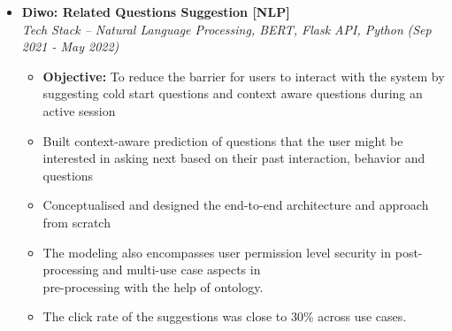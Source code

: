 \documentclass[a4paper,10pt]{article}
\newcommand{\isep}{-2 pt}
\begin{document}
\begin{itemize}
\item \textbf{Diwo: Related Questions Suggestion [NLP]}  \\
    \emph{Tech Stack -- Natural Language Processing, BERT, Flask API, Python } \hfill {\emph{(Sep 2021 - May 2022)}}
    \\[-0.6cm]
    \begin{itemize}\itemsep \isep
    	\item \textbf{Objective:} To reduce the barrier for users to interact with the system by suggesting cold start questions and context aware questions during an active session 
        \item Built context-aware prediction of questions that the user might be interested in asking next based on their past interaction, behavior and questions
        \item Conceptualised and designed the end-to-end architecture and approach from scratch 
        \item The modeling also encompasses user permission level security in post-processing and multi-use case aspects in \\ pre-processing with the help of ontology. 
        \item The click rate of the suggestions was close to 30\% across use cases.
        \\ [-0.5cm]
    \end{itemize}






\end{itemize}
\end{document}
